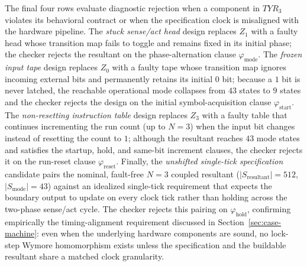The final four rows evaluate diagnostic rejection when a component in $TYR_3$ violates its behavioral contract or when the specification clock is misaligned with the hardware pipeline. The \emph{stuck sense/act head} design replaces $Z_1$ with a faulty head whose transition map fails to toggle and remains fixed in its initial phase; the checker rejects the resultant on the phase-alternation clause $\varphi_{\mathrm{mode}}$. The \emph{frozen input tape} design replaces $Z_0$ with a faulty tape whose transition map ignores incoming external bits and permanently retains its initial $0$ bit; because a $1$ bit is never latched, the reachable operational mode collapses from $43$ states to $9$ states and the checker rejects the design on the initial symbol-acquisition clause $\varphi_{\mathrm{start}}$. The \emph{non-resetting instruction table} design replaces $Z_3$ with a faulty table that continues incrementing the run count (up to $N=3$) when the input bit changes instead of resetting the count to $1$; although the resultant reaches $43$ mode states and satisfies the startup, hold, and same-bit increment clauses, the checker rejects it on the run-reset clause $\varphi_{\mathrm{reset}}$. Finally, the \emph{unshifted single-tick specification} candidate pairs the nominal, fault-free $N=3$ coupled resultant ($|S_{\mathrm{resultant}}|=512$, $|S_{\mathrm{mode}}|=43$) against an idealized single-tick requirement that expects the boundary output to update on every clock tick rather than holding across the two-phase sense/act cycle. The checker rejects this pairing on $\varphi_{\mathrm{hold}}$, confirming empirically the timing-alignment requirement discussed in Section~\ref{sec:case-machine}: even when the underlying hardware components are sound, no lock-step Wymore homomorphism exists unless the specification and the buildable resultant share a matched clock granularity.
